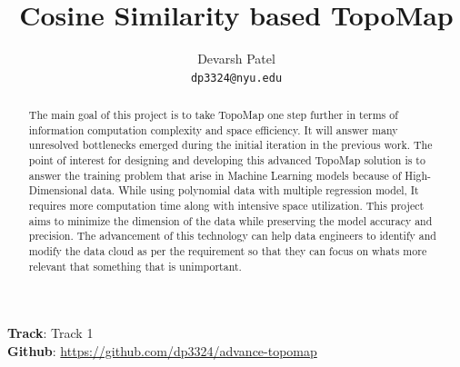 \documentclass[11pt, a4paper]{article}
\title{Cosine Similarity based TopoMap}
\author{Devarsh Patel \\
    \texttt{dp3324@nyu.edu}}
\affil{Master of Science in Computer Science, \\
    NYU Tandon School of Engineering}
\begin{document}
    \maketitle

    \begin{center}
        \textbf{Track}: Track 1 \\
        \medskip
        \textbf{Github}: \href{https://github.com/dp3324/advance-topomap}{https://github.com/dp3324/advance-topomap}
    \end{center}

    \medskip
    \begin{abstract}
        The main goal of this project is to take TopoMap\cite{harishd} one step further in terms of information computation complexity and space efficiency. It will answer many unresolved bottlenecks emerged during the initial iteration in the previous work. The point of interest for designing and developing this advanced TopoMap\cite{harishd} solution is to answer the training problem that arise in Machine Learning models because of High-Dimensional data. While using polynomial data with multiple regression model, It requires more computation time along with intensive space utilization. This project aims to minimize the dimension of the data while preserving the model accuracy and precision. The advancement of this technology can help data engineers to identify and modify the data cloud as per the requirement so that they can focus on whats more relevant that something that is unimportant.
    \end{abstract}
\end{document}
